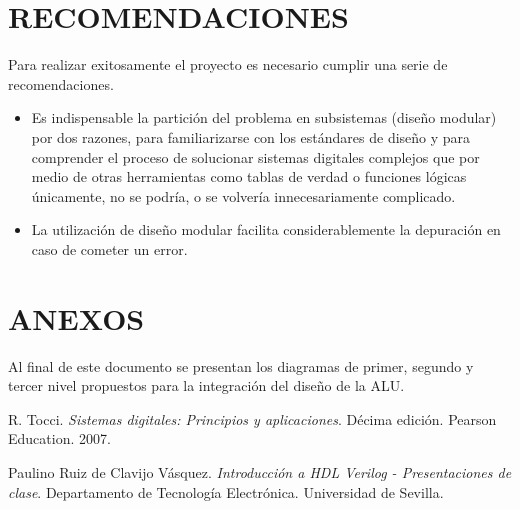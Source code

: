 \documentclass[journal,trans]{IEEEtran}
\begin{document}
\section{RECOMENDACIONES}
Para realizar exitosamente el proyecto es necesario cumplir una serie de recomendaciones.
\begin{itemize}
    \item Es indispensable la partición del problema en subsistemas (diseño modular) por dos razones, para familiarizarse con los estándares de diseño y para comprender el proceso de solucionar sistemas digitales complejos que por medio de otras herramientas como tablas de verdad o funciones lógicas únicamente, no se podría, o se volvería innecesariamente complicado.
    \item La utilización de diseño modular facilita considerablemente la depuración en caso de cometer un error.
\end{itemize}


\section{ANEXOS}
Al final de este documento se presentan los diagramas de primer, segundo y tercer nivel propuestos para la integración del diseño de la ALU. 

\begin{comment}
    El índice de los diagramas es el siguiente:
    \begin{itemize}
        \item Página 1. Diagrama de primer nivel.
        \item Página 2. Diagrama de segundo nivel.
        \item Página 3. Diagrama de tercer nivel: XOR, AND, OR y desplazamiento a la derecha.
        \item Página 4. Diagrama de tercer nivel: Banderas de Zero, Paridad, y de Desbordamiento.
        \item Página 5. Diagrama de tercer nivel: multiplicador con signo.
        \item Página 6. Diagrama de tercer nivel: detalle multiplicador.
        \item Página 7. Diagrama de tercer nivel circuito sumador y restador.
        \item Página 8. Diagrama de tercer nivel del circuito quintuplicador.
    \end{itemize}
\end{comment}

\begin{thebibliography}{1}

R. Tocci. \emph{Sistemas digitales: Principios y aplicaciones}. Décima edición. Pearson Education. 2007.

Paulino Ruiz de Clavijo Vásquez. \emph{Introducción a HDL Verilog - Presentaciones de clase}. Departamento de Tecnología Electrónica. Universidad de Sevilla.



\end{thebibliography}
\end{document}
